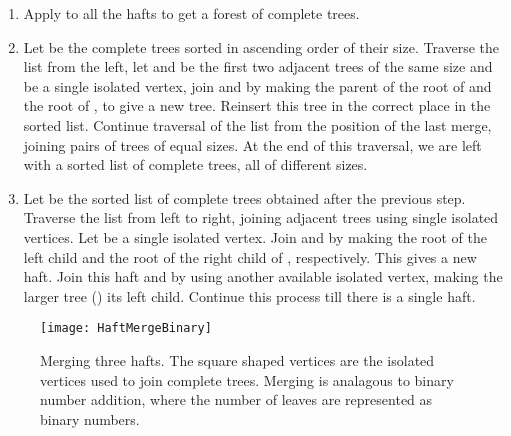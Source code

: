 \documentclass[11pt, letter]{article}
\begin{document}
\begin{enumerate}
\item Apply  to all the hafts to get a forest of  complete trees.
\item Let  be the  complete trees sorted in ascending order of their
size. Traverse the list from the left, let  and  be the first two adjacent trees of the same size and  be a
single isolated vertex, join  and  by making  the parent of the root of  and the root of
, to give a new tree. Reinsert this tree in the correct place in the sorted list. Continue traversal of the
list from the position of the last merge, joining pairs of trees of equal sizes. At the end of this traversal, we are
left with a sorted list of complete trees, all of different sizes.
\item Let    be the sorted list of complete trees obtained after the previous step. Traverse
the list from left to right, joining adjacent trees using single isolated vertices.  Let  be a single isolated
vertex. Join  and  by making the root of  the left child and the root of  the right child of
, respectively. This gives a new haft. Join this haft and   by using another available isolated
vertex, making the larger tree ()  its left child. Continue this process till there is a single haft.
\end{enumerate}


\begin{figure}[h!]
\centering
\texttt{[image: HaftMergeBinary]}
\caption{Merging three hafts. The square shaped vertices are the isolated vertices used to join complete trees.
Merging is analagous to binary number addition, where the number of leaves are represented as binary numbers.}
\label{fig: haftmergebinary}
\end{figure}
\end{document}
